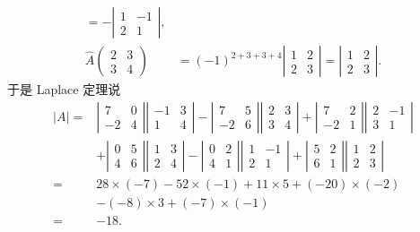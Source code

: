\documentclass[UTF8, 12pt, fontset=fandol, oneside]{ctexart}
\begin{document}
\[\begin{array}{rl}
=-\left|\begin{array}{cc}1&-1\\2&1\end{array}\right|,\\[1.2em]
\widehat{A}\left(\begin{array}{cc}2&3\\3&4\end{array}\right)
&=(-1)^{2+3+3+4}\left|\begin{array}{cc}1&2\\2&3\end{array}\right|
=\left|\begin{array}{cc}1&2\\2&3\end{array}\right|.
\end{array}
\]
于是 Laplace 定理说
\[
\begin{aligned}
|A|={}&
\left|\begin{array}{cc}7&0\\-2&4\end{array}\right|
\left|\begin{array}{cc}-1&3\\1&4\end{array}\right|
-
\left|\begin{array}{cc}7&5\\-2&6\end{array}\right|
\left|\begin{array}{cc}2&3\\3&4\end{array}\right|
+
\left|\begin{array}{cc}7&2\\-2&1\end{array}\right|
\left|\begin{array}{cc}2&-1\\3&1\end{array}\right|\\
&+
\left|\begin{array}{cc}0&5\\4&6\end{array}\right|
\left|\begin{array}{cc}1&3\\2&4\end{array}\right|
-
\left|\begin{array}{cc}0&2\\4&1\end{array}\right|
\left|\begin{array}{cc}1&-1\\2&1\end{array}\right|
+
\left|\begin{array}{cc}5&2\\6&1\end{array}\right|
\left|\begin{array}{cc}1&2\\2&3\end{array}\right|\\
= {}& 28\times(-7)-52\times(-1)+11\times5+(-20)\times(-2)\\
&-(-8)\times3+(-7)\times(-1)\\
= {}& -18.
\end{aligned}
\]
\end{document}
